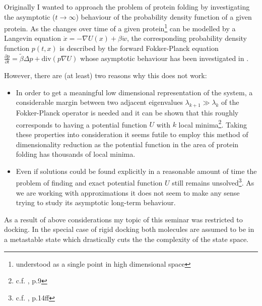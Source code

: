Originally I wanted to approach the problem of protein folding by investigating the asymptotic ($t\rightarrow\infty$) behaviour of the probability density function of a given protein. As the changes over time of a given protein\footnote{understood as a single point in high dimensional space} can be modelled by a Langevin equation $\dot x = -\nabla U(x)+\beta\dot w$, the corresponding probability density function $p(t,x)$ is described by the forward Fokker-Planck equation $\frac{\partial p}{\partial t} = \tilde\beta \Delta p + \text{div}(p\nabla U)$ whose asymptotic behaviour has been investigated in \cite{Nadler2008}.

However, there are (at least) two reasons why this does not work:
\begin{itemize}
	\item In order to get a meaningful low dimensional representation of the system, a considerable margin between two adjacent eigenvalues $\lambda_{k+1} \gg \lambda_k$ of the Fokker-Planck operator is needed and it can be shown that this roughly corresponds to having a potential function $U$ with $k$ local minima\footnote{c.f. \cite{Nadler2008}, p.9}. Taking these properties into consideration it seems futile to employ this method of dimensionality reduction as the potential function in the area of protein folding has thousands of local minima.
	\item Even if solutions could be found explicitly in a reasonable amount of time the problem of finding and exact potential function $U$ still remains unsolved\footnote{c.f. \cite{Neumaier97}, p.14ff}. As we are working with approximations it does not seem to make any sense trying to study its asymptotic long-term behaviour.
\end{itemize}

As a result of above considerations my topic of this seminar was restricted to docking. In the special case of rigid docking both molecules are assumed to be in a metastable state which drastically cuts the the complexity of the state space.  